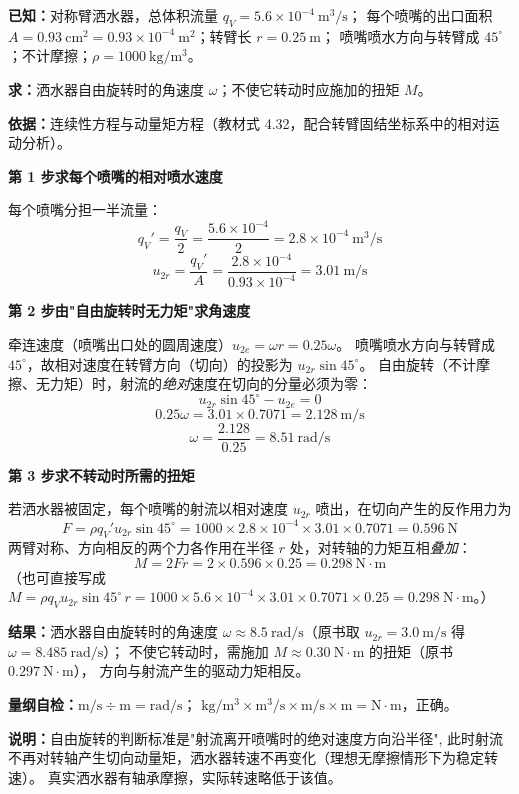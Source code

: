 \begin{jie}
\textbf{已知：}对称臂洒水器，总体积流量 $q_V=5.6\times10^{-4}\ \mathrm{m^3/s}$；
每个喷嘴的出口面积 $A=0.93\ \mathrm{cm^2}=0.93\times10^{-4}\ \mathrm{m^2}$；转臂长 $r=0.25\ \mathrm{m}$；
喷嘴喷水方向与转臂成 $45^\circ$；不计摩擦；$\rho=1000\ \mathrm{kg/m^3}$。

\textbf{求：}洒水器自由旋转时的角速度 $\omega$；不使它转动时应施加的扭矩 $M$。

\textbf{依据：}连续性方程与动量矩方程（教材式 4.32，配合转臂固结坐标系中的相对运动分析）。

\textbf{第 1 步\quad 求每个喷嘴的相对喷水速度}

每个喷嘴分担一半流量：
\[ q_V'=\frac{q_V}{2}=\frac{5.6\times10^{-4}}{2}=2.8\times10^{-4}\ \mathrm{m^3/s} \]
\[ u_{2r}=\frac{q_V'}{A}=\frac{2.8\times10^{-4}}{0.93\times10^{-4}}=3.01\ \mathrm{m/s} \]

\textbf{第 2 步\quad 由"自由旋转时无力矩"求角速度}

牵连速度（喷嘴出口处的圆周速度）$u_{2e}=\omega r=0.25\omega$。
喷嘴喷水方向与转臂成 $45^\circ$，故相对速度在转臂方向（切向）的投影为 $u_{2r}\sin45^\circ$。
自由旋转（不计摩擦、无力矩）时，射流的\emph{绝对}速度在切向的分量必须为零：
\[ u_{2r}\sin45^\circ-u_{2e}=0 \]
\[ 0.25\omega=3.01\times0.7071=2.128\ \mathrm{m/s} \]
\[ \omega=\frac{2.128}{0.25}=8.51\ \mathrm{rad/s} \]

\textbf{第 3 步\quad 求不转动时所需的扭矩}

若洒水器被固定，每个喷嘴的射流以相对速度 $u_{2r}$ 喷出，在切向产生的反作用力为
\[ F=\rho q_V'u_{2r}\sin45^\circ=1000\times2.8\times10^{-4}\times3.01\times0.7071=0.596\ \mathrm{N} \]
两臂对称、方向相反的两个力各作用在半径 $r$ 处，对转轴的力矩互相\emph{叠加}：
\[ M=2Fr=2\times0.596\times0.25=0.298\ \mathrm{N\cdot m} \]
（也可直接写成 $M=\rho q_Vu_{2r}\sin45^\circ\,r=1000\times5.6\times10^{-4}\times3.01\times0.7071\times0.25=0.298\ \mathrm{N\cdot m}$。）

\textbf{结果：}洒水器自由旋转时的角速度 $\omega\approx8.5\ \mathrm{rad/s}$（原书取 $u_{2r}=3.0\ \mathrm{m/s}$ 得 $\omega=8.485\ \mathrm{rad/s}$）；
不使它转动时，需施加 $M\approx0.30\ \mathrm{N\cdot m}$ 的扭矩（原书 $0.297\ \mathrm{N\cdot m}$），
方向与射流产生的驱动力矩相反。

\textbf{量纲自检：}$\mathrm{m/s\div m}=\mathrm{rad/s}$；
$\mathrm{kg/m^3\times m^3/s\times m/s\times m}=\mathrm{N\cdot m}$，正确。

\textbf{说明：}自由旋转的判断标准是"射流离开喷嘴时的绝对速度方向沿半径",
此时射流不再对转轴产生切向动量矩，洒水器转速不再变化（理想无摩擦情形下为稳定转速）。
真实洒水器有轴承摩擦，实际转速略低于该值。
\end{jie}


